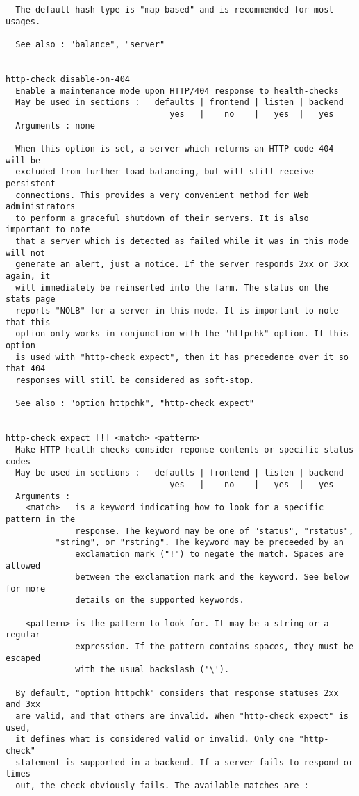 \begin{verbatim}
  The default hash type is "map-based" and is recommended for most usages.

  See also : "balance", "server"


http-check disable-on-404
  Enable a maintenance mode upon HTTP/404 response to health-checks
  May be used in sections :   defaults | frontend | listen | backend
                                 yes   |    no    |   yes  |   yes
  Arguments : none

  When this option is set, a server which returns an HTTP code 404 will be
  excluded from further load-balancing, but will still receive persistent
  connections. This provides a very convenient method for Web administrators
  to perform a graceful shutdown of their servers. It is also important to note
  that a server which is detected as failed while it was in this mode will not
  generate an alert, just a notice. If the server responds 2xx or 3xx again, it
  will immediately be reinserted into the farm. The status on the stats page
  reports "NOLB" for a server in this mode. It is important to note that this
  option only works in conjunction with the "httpchk" option. If this option
  is used with "http-check expect", then it has precedence over it so that 404
  responses will still be considered as soft-stop.

  See also : "option httpchk", "http-check expect"


http-check expect [!] <match> <pattern>
  Make HTTP health checks consider reponse contents or specific status codes
  May be used in sections :   defaults | frontend | listen | backend
                                 yes   |    no    |   yes  |   yes
  Arguments :
    <match>   is a keyword indicating how to look for a specific pattern in the
              response. The keyword may be one of "status", "rstatus",
	      "string", or "rstring". The keyword may be preceeded by an
              exclamation mark ("!") to negate the match. Spaces are allowed
              between the exclamation mark and the keyword. See below for more
              details on the supported keywords.

    <pattern> is the pattern to look for. It may be a string or a regular
              expression. If the pattern contains spaces, they must be escaped
              with the usual backslash ('\').

  By default, "option httpchk" considers that response statuses 2xx and 3xx
  are valid, and that others are invalid. When "http-check expect" is used,
  it defines what is considered valid or invalid. Only one "http-check"
  statement is supported in a backend. If a server fails to respond or times
  out, the check obviously fails. The available matches are :


\end{verbatim}
